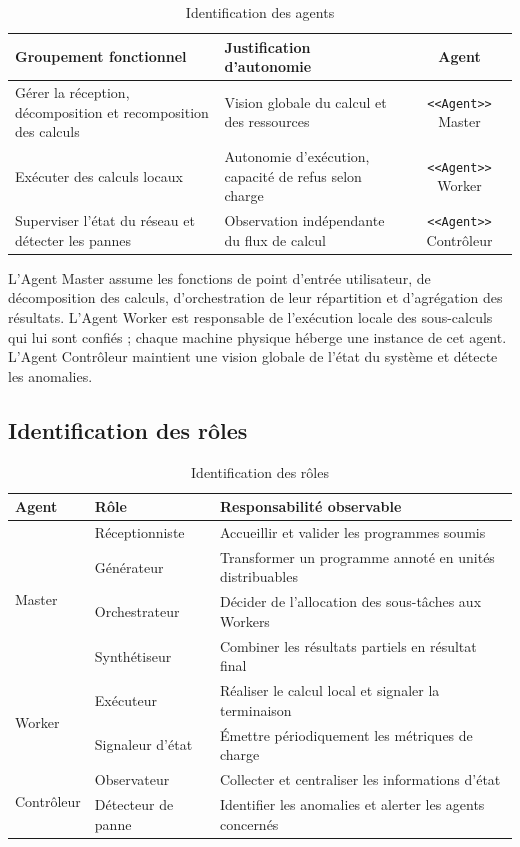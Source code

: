 \documentclass[12pt,a4paper]{report}
\begin{document}
\begin{table}[H]
\centering
\renewcommand{\arraystretch}{1.3}
\begin{tabular}{|p{4.5cm}|p{5.5cm}|c|}
\hline
\textbf{Groupement fonctionnel} & \textbf{Justification d'autonomie} & \textbf{Agent} \\
\hline
Gérer la réception, décomposition et recomposition des calculs & Vision globale du calcul et des ressources & \texttt{<<Agent>>} Master \\
\hline
Exécuter des calculs locaux & Autonomie d'exécution, capacité de refus selon charge & \texttt{<<Agent>>} Worker \\
\hline
Superviser l'état du réseau et détecter les pannes & Observation indépendante du flux de calcul & \texttt{<<Agent>>} Contrôleur \\
\hline
\end{tabular}
\caption{Identification des agents}
\label{tab:identification_agents}
\end{table}

L'Agent Master assume les fonctions de point d'entrée utilisateur, de décomposition des calculs, d'orchestration de leur répartition et d'agrégation des résultats. L'Agent Worker est responsable de l'exécution locale des sous-calculs qui lui sont confiés ; chaque machine physique héberge une instance de cet agent. L'Agent Contrôleur maintient une vision globale de l'état du système et détecte les anomalies.

\subsection{Identification des rôles}

\begin{table}[H]
\centering
\renewcommand{\arraystretch}{1.3}
\begin{tabular}{|l|l|l|}
\hline
\textbf{Agent} & \textbf{Rôle} & \textbf{Responsabilité observable} \\
\hline
\multirow{4}{*}{Master} & Réceptionniste & Accueillir et valider les programmes soumis \\
 & Générateur & Transformer un programme annoté en unités distribuables \\
 & Orchestrateur & Décider de l'allocation des sous-tâches aux Workers \\
 & Synthétiseur & Combiner les résultats partiels en résultat final \\
\hline
\multirow{2}{*}{Worker} & Exécuteur & Réaliser le calcul local et signaler la terminaison \\
 & Signaleur d'état & Émettre périodiquement les métriques de charge \\
\hline
\multirow{2}{*}{Contrôleur} & Observateur & Collecter et centraliser les informations d'état \\
 & Détecteur de panne & Identifier les anomalies et alerter les agents concernés \\
\hline
\end{tabular}
\caption{Identification des rôles}
\label{tab:identification_roles}
\end{table}
\end{document}

